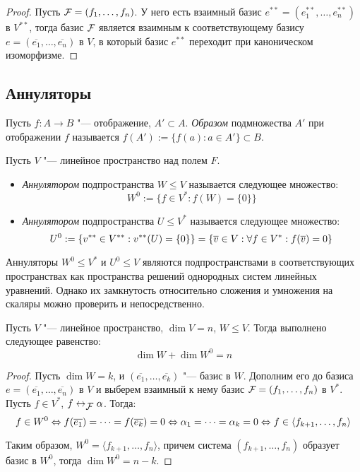 \begin{proof}
	Пусть $\FF  = (f_1, \dots, f_n)$. У него есть взаимный базис $e^{**} = (e_1^{**}, \dots, e_n^{**})$ в $V^{**}$, тогда базис $\FF $ является взаимным к соответствующему базису $e = (\overline{e_1}, \dots, \overline{e_n})$ в $V$, в который базис $e^{**}$ переходит при каноническом изоморфизме.
\end{proof}

\subsection{Аннуляторы}

\begin{definition}
	Пусть $f: A \rightarrow B$ "--- отображение, $A' \subset A$. \textit{Образом} подмножества $A'$ при отображении $f$ называется $f(A') := \{f(a): a \in A'\} \subset B$.
\end{definition}

\pagebreak 
\begin{definition}
	Пусть $V$ "--- линейное пространство над полем $F$.
	\begin{itemize}
		\item \textit{Аннулятором} подпространства $W \le V$ называется следующее множество:
		\[W^0 := \{f \in V^*: f(W) = \{0\}\}\]
		\item \textit{Аннулятором} подпространства $U \le V^*$ называется следующее множество:
		\[
		U^0 := \{v^{**} \in V^{**}: v^{**}(U) = \{0\}\}
		\hm{=}
		\{\overline{v} \in V: \forall f \in V^*: f(\overline{v}) = 0\}
		\]
	\end{itemize}
\end{definition}

\begin{note}
	Аннуляторы $W^0 \le V^*$ и $U^0 \le V$ являются подпространствами в соответствующих пространствах как пространства решений однородных систем линейных уравнений. Однако их замкнутость относительно сложения и умножения на скаляры можно проверить и непосредственно.
\end{note}

\begin{theorem}
	Пусть $V$ "--- линейное пространство, $\dim{V} = n$, $W \le V$. Тогда выполнено следующее равенство:
	\[\dim{W} + \dim{W^0} = n\]
\end{theorem}

\begin{proof}
	Пусть $\dim{W} = k$, и $(\overline{e_1}, \dots, \overline{e_k})$ "--- базис в $W$. Дополним его до базиса $e = (\overline{e_1}, \dots, \overline{e_n})$ в $V$ и выберем взаимный к нему базис $\FF  = (f_1, \dots, f_n)$ в $V^*$. Пусть $f \in V^*$, $f \leftrightarrow_{\FF } \alpha$. Тогда:
	\[f \in W^0 \lra f(\overline{e_1}) = \dots = f(\overline{e_k}) = 0 \lra \alpha_1 \hm{=} \dots = \alpha_k = 0 \Leftrightarrow f \in \langle f_{k+1}, \dots, f_n\rangle\]
	
	Таким образом, $W^0 = \langle f_{k+1}, \dots, f_n \rangle$, причем система $(f_{k+1}, \dots, f_n)$ образует базис в $W^0$, тогда $\dim{W^0} = n - k$.
\end{proof}

